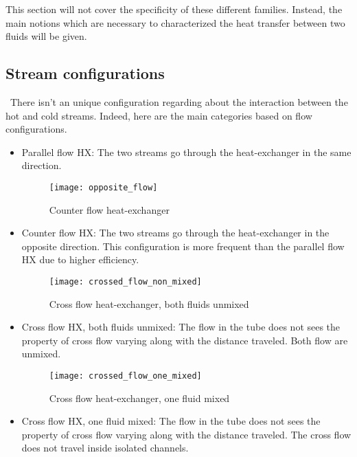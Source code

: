 This section will not cover the specificity of these different families. Instead, the main notions which are necessary to characterized the heat transfer between two fluids will be given.

\subsection{Stream configurations}
\quad\, There isn't an unique configuration regarding about the interaction between the hot and cold streams. Indeed, here are the main categories based on flow configurations.

\begin{itemize}
\begin{figure}[h]
\centering
\texttt{[image: parallele\_flow]}
\caption{Parallel flow heat-exchanger \citep{Ngendakumana2018}}
\label{fig:C3_para_flow}
\end{figure}

\item Parallel flow HX: The two streams go through the heat-exchanger in the same direction. 

\begin{figure}[h]
\centering
\texttt{[image: opposite\_flow]}
\caption{Counter flow heat-exchanger \citep{Ngendakumana2018}}
\label{fig:C3_counter_flow}
\end{figure}

\item Counter flow HX: The two streams go through the heat-exchanger in the opposite direction. This configuration is more frequent than the parallel flow HX due to higher efficiency.

\begin{figure}[h]
\centering
\texttt{[image: crossed\_flow\_non\_mixed]}
\caption{Cross flow heat-exchanger, both fluids unmixed \citep{Ngendakumana2018}}
\label{fig:C3_cross_flow_unmixed}
\end{figure}

\item Cross flow HX, both fluids unmixed: The flow in the tube does not sees the property of cross flow varying along with the distance traveled. Both flow are unmixed.
\newpage
\begin{figure}[h]
\centering
\texttt{[image: crossed\_flow\_one\_mixed]}
\caption{Cross flow heat-exchanger, one fluid mixed \citep{Ngendakumana2018}}
\label{fig:C3_cross_flow_1mixed}
\end{figure}

\item Cross flow HX, one fluid mixed: The flow in the tube does not sees the property of cross flow varying along with the distance traveled. The cross flow does not travel inside isolated channels.
\end{itemize}

